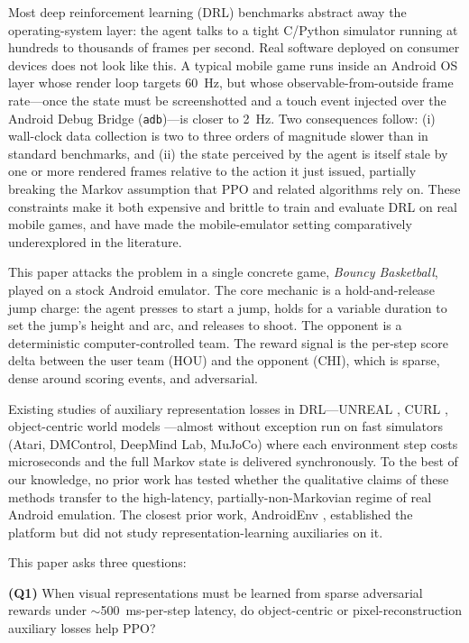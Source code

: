 \documentclass{article}
\begin{document}
Most deep reinforcement learning (DRL) benchmarks abstract away the
operating-system layer: the agent talks to a tight C/Python
simulator running at hundreds to thousands of frames per second.
Real software deployed on consumer devices does not look like this.
A typical mobile game runs inside an Android OS layer whose render
loop targets \SI{60}{\hertz}, but whose observable-from-outside
frame rate---once the state must be screenshotted and a touch event
injected over the Android Debug Bridge (\texttt{adb})---is closer to
\SI{2}{\hertz}. Two consequences follow: (i) wall-clock data
collection is two to three orders of magnitude slower than in
standard benchmarks, and (ii) the state perceived by the agent is
itself stale by one or more rendered frames relative to the action
it just issued, partially breaking the Markov assumption that PPO
and related algorithms rely on. These constraints make it both
expensive and brittle to train and evaluate DRL on real mobile
games, and have made the mobile-emulator setting comparatively
underexplored in the literature.

This paper attacks the problem in a single concrete game,
\emph{Bouncy Basketball}, played on a stock Android emulator. The
core mechanic is a hold-and-release jump charge: the agent presses
to start a jump, holds for a variable duration to set the jump's
height and arc, and releases to shoot. The opponent is a
deterministic computer-controlled team. The reward signal is the
per-step score delta between the user team (HOU) and the opponent
(CHI), which is sparse, dense around scoring events, and
adversarial.

Existing studies of auxiliary representation losses in DRL---UNREAL
\cite{jaderberg2017unreal}, CURL \cite{laskin2020curl},
object-centric world models \cite{ferraro2024focus,zhang2025ocstorm}
---almost without exception run on fast simulators (Atari,
DMControl, DeepMind Lab, MuJoCo) where each environment step costs
microseconds and the full Markov state is delivered synchronously.
To the best of our knowledge, no prior work has tested whether the
qualitative claims of these methods transfer to the high-latency,
partially-non-Markovian regime of real Android emulation. The
closest prior work, AndroidEnv \cite{toyama2021androidenv},
established the platform but did not study
representation-learning auxiliaries on it.

This paper asks three questions:

\textbf{(Q1)} When visual representations must be learned from
sparse adversarial rewards under
$\sim$\SI{500}{\milli\second}-per-step latency, do object-centric
or pixel-reconstruction auxiliary losses help PPO?
\end{document}
